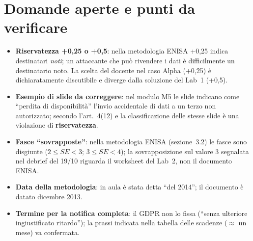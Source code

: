 \section{Domande aperte e punti da verificare}
\begin{verifica}
\begin{itemize}
  \item \textbf{Riservatezza +0,25 o +0,5}: nella metodologia ENISA +0,25 indica destinatari
    \emph{noti}; un attaccante che può rivendere i dati è difficilmente un destinatario noto. La scelta
    del docente nel caso Alpha (+0,25) è dichiaratamente discutibile e diverge dalla soluzione del Lab~1
    (+0,5).
  \item \textbf{Esempio di slide da correggere}: nel modulo M5 le slide indicano come ``perdita di
    disponibilità'' l'invio accidentale di dati a un terzo non autorizzato; secondo l'art.~4(12) e la
    classificazione delle stesse slide è una violazione di \textbf{riservatezza}.
  \item \textbf{Fasce ``sovrapposte''}: nella metodologia ENISA (sezione~3.2) le fasce sono disgiunte
    ($2 \le SE < 3$; $3 \le SE < 4$); la sovrapposizione sul valore 3 segnalata nel debrief del 19/10
    riguarda il worksheet del Lab~2, non il documento ENISA.
  \item \textbf{Data della metodologia}: in aula è stata detta ``del 2014''; il documento è datato
    dicembre 2013.
  \item \textbf{Termine per la notifica completa}: il GDPR non lo fissa (``senza ulteriore ingiustificato
    ritardo''); la prassi indicata nella tabella delle scadenze ($\approx$ un mese) va confermata.
\end{itemize}
\end{verifica}
